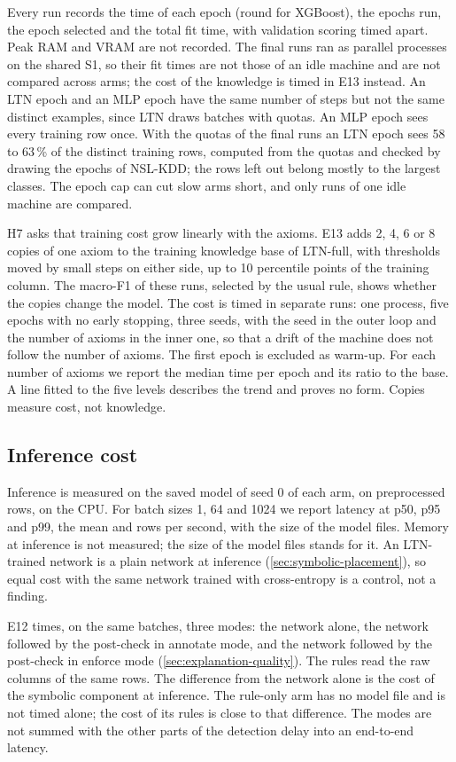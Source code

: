 Every run records the time of each epoch (round for XGBoost), the epochs run, the epoch
selected and the total fit time, with validation scoring timed apart. Peak RAM and VRAM are not
recorded. The final runs ran as parallel processes on the shared S1, so their fit times are not
those of an idle machine and are not compared across arms; the cost of the knowledge
is timed in E13 instead. An LTN epoch and an MLP epoch have the same number
of steps but not the same distinct examples, since LTN draws batches with quotas. An MLP epoch
sees every training row once. With the quotas of the final runs an LTN epoch sees 58 to 63\,\%
of the distinct training rows, computed from the quotas and checked by drawing the epochs of
NSL-KDD; the rows left out belong mostly to the largest classes. The epoch cap can cut slow
arms short, and only runs of one idle machine are compared.

H7 asks that training cost grow linearly with the axioms. E13 adds 2, 4, 6 or 8 copies of one
axiom to the training knowledge base of LTN-full, with thresholds moved by small steps on either
side, up to 10 percentile points of the training column. The macro-F1 of these runs, selected by
the usual rule, shows whether the copies change the model. The cost is timed in separate runs:
one process, five epochs with no early stopping, three seeds, with the seed in the outer loop and
the number of axioms in the inner one, so that a drift of the machine does not follow the number
of axioms. The first epoch is excluded as warm-up. For each number of axioms we report the median
time per epoch and its ratio to the base. A line fitted to the five levels describes the trend
and proves no form. Copies measure cost, not knowledge.

\subsection{Inference cost}
\label{sec:inference-cost}

Inference is measured on the saved model of seed 0 of each arm, on preprocessed rows, on the CPU.
For batch sizes 1, 64 and 1024 we report latency at p50, p95 and p99, the mean and rows per
second, with the size of the model files. Memory at inference is not measured; the size of the
model files stands for it. An LTN-trained network is a plain network at inference
(\cref{sec:symbolic-placement}), so equal cost with the same network trained with cross-entropy
is a control, not a finding.

E12 times, on the same batches, three modes: the network alone, the network followed by the
post-check in annotate mode, and the network followed by the post-check in enforce mode
(\cref{sec:explanation-quality}). The rules read the raw columns of the same rows. The
difference from the network alone is the cost of the symbolic component at inference. The
rule-only arm has no model file and is not timed alone; the cost of its rules is close to that
difference. The modes are not summed with the other parts of the detection delay into an
end-to-end latency.

